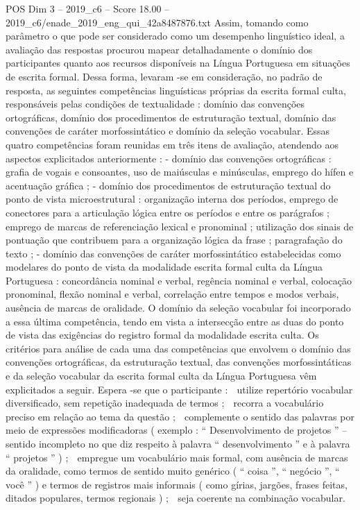 \begin{textsample}{POS Dim 3 – 2019\_c6 – Score 18.00 – 2019\_c6/enade\_2019\_eng\_qui\_42a8487876.txt}
Assim, tomando como parâmetro o que pode ser considerado como um desempenho linguístico ideal, a avaliação das respostas procurou mapear detalhadamente o domínio dos participantes quanto aos recursos disponíveis na Língua Portuguesa em situações de escrita formal.
Dessa forma, levaram -se em consideração, no padrão de resposta, as seguintes competências linguísticas próprias da escrita formal culta, responsáveis pelas condições de textualidade : domínio das convenções ortográficas, domínio dos procedimentos de estruturação textual, domínio das convenções de caráter morfossintático e domínio da seleção vocabular.
Essas quatro competências foram reunidas em três itens de avaliação, atendendo aos aspectos explicitados anteriormente : - domínio das convenções ortográficas : grafia de vogais e consoantes, uso de maiúsculas e minúsculas, emprego do hífen e acentuação gráfica ; - domínio dos procedimentos de estruturação textual do ponto de vista microestrutural : organização interna dos períodos, emprego de conectores para a articulação lógica entre os períodos e entre os parágrafos ; emprego de marcas de referenciação lexical e pronominal ; utilização dos sinais de pontuação que contribuem para a organização lógica da frase ; paragrafação do texto ; - domínio das convenções de caráter morfossintático estabelecidas como modelares do ponto de vista da modalidade escrita formal culta da Língua Portuguesa : concordância nominal e verbal, regência nominal e verbal, colocação pronominal, flexão nominal e verbal, correlação entre tempos e modos verbais, ausência de marcas de oralidade.
O domínio da seleção vocabular foi incorporado a essa última competência, tendo em vista a intersecção entre as duas do ponto de vista das exigências do registro formal da modalidade escrita culta.
Os critérios para análise de cada uma das competências que envolvem o domínio das convenções ortográficas, da estruturação textual, das convenções morfossintáticas e da seleção vocabular da escrita formal culta da Língua Portuguesa vêm explicitados a seguir.
Espera -se que o participante :  utilize repertório vocabular diversificado, sem repetição inadequada de termos ;  recorra a vocabulário preciso em relação ao tema da questão ;  complemente o sentido das palavras por meio de expressões modificadoras ( exemplo : “ Desenvolvimento de projetos ” – sentido incompleto no que diz respeito à palavra “ desenvolvimento ” e à palavra “ projetos ” ) ;  empregue um vocabulário mais formal, com ausência de marcas da oralidade, como termos de sentido muito genérico ( “ coisa ”, “ negócio ”, “ você ” ) e termos de registros mais informais ( como gírias, jargões, frases feitas, ditados populares, termos regionais ) ;  seja coerente na combinação vocabular.

\end{textsample}
